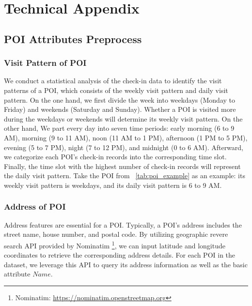 \clearpage
\section*{Technical Appendix}

\subsection{POI Attributes Preprocess} \label{sec: data preprocess}    
    \subsubsection{Visit Pattern of POI}
    We conduct a statistical analysis of the check-in data to identify the visit patterns of a POI, which consists of the weekly visit pattern and daily visit pattern.  On the one hand, we first divide the week into weekdays (Monday to Friday) and weekends (Saturday and Sunday). Whether a POI is visited more during the weekdays or weekends will determine its weekly visit pattern. On the other hand, We part every day into seven time periods: early morning (6 to 9 AM), morning (9 to 11 AM), noon (11 AM to 1 PM), afternoon (1 PM to 5 PM), evening (5 to 7 PM), night (7 to 12 PM), and midnight (0 to 6 AM).  Afterward, we categorize each POI's check-in records into the corresponding time slot. Finally, the time slot with the highest number of check-in records will represent the daily visit pattern. Take the POI from \tableautorefname~\ref{tab:poi_example} as an example: its weekly visit pattern is weekdays, and its daily visit pattern is 6 to 9 AM.

    \subsubsection{Address of POI}
    Address features are essential for a POI. Typically, a POI's address includes the street name, house number, and postal code.  By utilizing geographic revere search API provided by Nominatim \footnote{Nominatim: \url{https://nominatim.openstreetmap.org}}, we can input latitude and longitude coordinates to retrieve the corresponding address details.  For each POI in the dataset, we leverage this API to query its address information as well as the basic attribute $Name$. 

